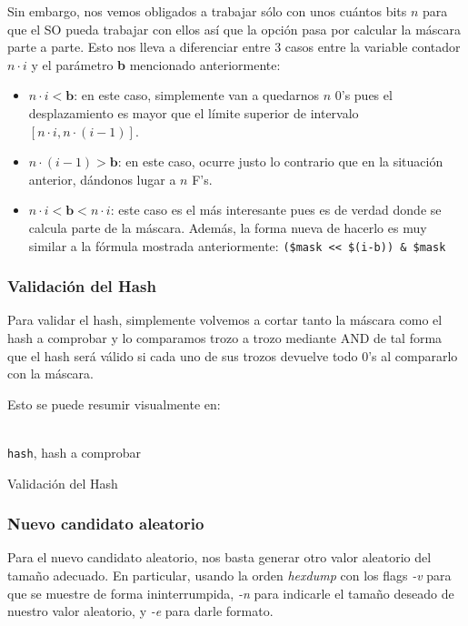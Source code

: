\documentclass[a4paper, 11pt]{article}
\begin{document}
			Sin embargo, nos vemos obligados a trabajar sólo con unos cuántos bits $n$ para que el SO pueda trabajar con ellos
			así que la opción pasa por calcular la máscara parte a parte. Esto nos lleva a diferenciar entre 3 casos entre
			la variable contador $n \cdot i$ y el parámetro \textbf{b} mencionado anteriormente:
			\begin{itemize}
				\item $n \cdot i < \textbf{b}$: en este caso, simplemente van a quedarnos $n$ 0's pues el desplazamiento es
				mayor que el límite superior de intervalo $[n \cdot i, n \cdot (i-1)]$.
				\item $n \cdot (i-1) > \textbf{b}$: en este caso, ocurre justo lo contrario que en la situación anterior,
				dándonos lugar a $n$ F's.
				\item $n \cdot i < \textbf{b} < n \cdot i$: este caso es el más interesante pues es de verdad donde se
				calcula parte de la máscara. Además, la forma nueva de hacerlo es muy similar a la fórmula mostrada anteriormente:
				\verb|($mask << $(i-b)) & $mask|
			\end{itemize}
			
		\subsubsection{Validación del Hash}
			Para validar el hash, simplemente volvemos a cortar tanto la máscara como el hash a comprobar y lo comparamos trozo a trozo mediante AND de tal forma que el hash será válido si cada uno de sus trozos devuelve todo 0's al compararlo con la máscara.
			
			Esto se puede resumir visualmente en:
			\begin{algorithm}[H]
				\begin{algorithmic}[1]
					\REQUIRE \ \\
						\texttt{hash}, hash a comprobar \\
						\ENDIF
					\ENDFOR
				\end{algorithmic}
				\caption{Validación del Hash}
				\label{valid_Hash}
			\end{algorithm}
			
		\subsubsection{Nuevo candidato aleatorio}
			Para el nuevo candidato aleatorio, nos basta generar otro valor aleatorio del tamaño adecuado. En particular, usando
			la orden \textit{hexdump} con los flags \textit{-v} para que se muestre de forma ininterrumpida, \textit{-n} para
			indicarle el tamaño deseado de nuestro valor aleatorio, y \textit{-e} para darle formato.
		
\end{document}
